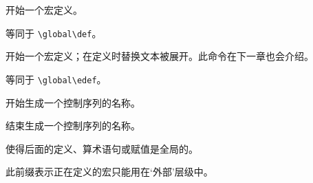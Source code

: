 \documentclass{book}
\begin{document}
\label{cschap:def}\label{cschap:gdef}\label{cschap:edef}\label{cschap:xdef}
\label{cschap:csname}\label{cschap:endcsname}\label{cschap:global2}
\label{cschap:outer}\label{cschap:long}\label{cschap:let}\label{cschap:futurelet}
\begin{inventory}
\item [\cs{def}] 
      开始一个宏定义。

\item [\cs{gdef}] 
      等同于 \verb-\global\def-。

\item [\cs{edef}] 
      开始一个宏定义；在定义时替换文本被展开。此命令在下一章也会介绍。 

\item [\cs{xdef}] 
      等同于 \verb-\global\edef-。

\item [\cs{csname}] 
      开始生成一个控制序列的名称。

\item [\cs{endcsname}] 
      结束生成一个控制序列的名称。

\item [\cs{global}] 
      使得后面的定义、算术语句或赋值是全局的。

\item [\cs{outer}] 
      此前缀表示正在定义的宏只能用在`外部'层级中。


\end{inventory}
\end{document}
